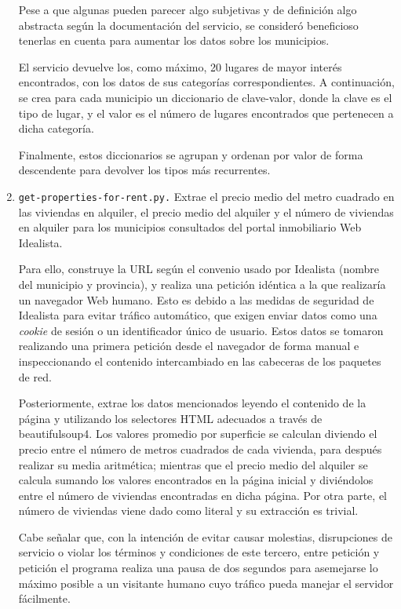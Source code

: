 \begin{enumerate}
    Pese a que algunas pueden parecer algo subjetivas y de definición algo abstracta según la documentación del servicio, se consideró beneficioso tenerlas en cuenta para aumentar los datos sobre los municipios.

    El servicio devuelve los, como máximo, 20 lugares de mayor interés encontrados, con los datos de sus categorías correspondientes. A continuación, se crea para cada municipio un diccionario de clave-valor, donde la clave es el tipo de lugar, y el valor es el número de lugares encontrados que pertenecen a dicha categoría.

    Finalmente, estos diccionarios se agrupan y ordenan por valor de forma descendente para devolver los tipos más recurrentes.

    \item \texttt{get-properties-for-rent.py.} Extrae el precio medio del metro cuadrado en las viviendas en alquiler, el precio medio del alquiler y el número de viviendas en alquiler para los municipios consultados del portal inmobiliario Web Idealista.

    Para ello, construye la URL según el convenio usado por Idealista (nombre del municipio y provincia), y realiza una petición idéntica a la que realizaría un navegador Web humano. Esto es debido a las medidas de seguridad de Idealista para evitar tráfico automático, que exigen enviar datos como una \textit{cookie} de sesión o un identificador único de usuario. Estos datos se tomaron realizando una primera petición desde el navegador de forma manual e inspeccionando el contenido intercambiado en las cabeceras de los paquetes de red.

    Posteriormente, extrae los datos mencionados leyendo el contenido de la página y utilizando los selectores HTML adecuados a través de beautifulsoup4. Los valores promedio por superficie se calculan diviendo el precio entre el número de metros cuadrados de cada vivienda, para después realizar su media aritmética; mientras que el precio medio del alquiler se calcula sumando los valores encontrados en la página inicial y diviéndolos entre el número de viviendas encontradas en dicha página. Por otra parte, el número de viviendas viene dado como literal y su extracción es trivial.

    Cabe señalar que, con la intención de evitar causar molestias, disrupciones de servicio o violar los términos y condiciones de este tercero, entre petición y petición el programa realiza una pausa de dos segundos para asemejarse lo máximo posible a un visitante humano cuyo tráfico pueda manejar el servidor fácilmente.


\end{enumerate}
